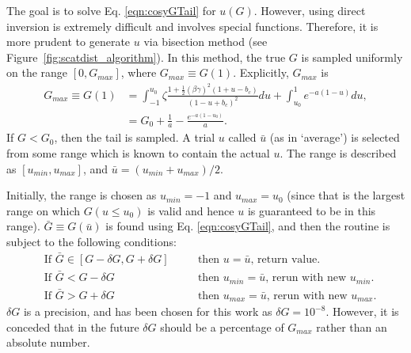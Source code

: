 The goal is to solve Eq. \eqref{eqn:cosyGTail} for $u(G)$. However, using direct inversion is extremely difficult and involves special functions. Therefore, it is more prudent to generate  $u$ via bisection method (see Figure~\ref{fig:scatdist_algorithm}). In this method, the true $G$ is sampled uniformly on the range $[0,G_{max}]$, where $G_{max} \equiv G(1)$. Explicitly, $G_{max}$ is
\begin{align*}
G_{max}\equiv G(1) &=\int_{-1} ^{u_0} \zeta\frac{1+\frac{1}{2}(\beta\gamma)^2(1+u-b_c)}{(1-u+b_c)^2}du+\int_{u_0} ^1 e^{-a(1-u)} du,\\
&= G_0+\frac{1}{a}-\frac{e^{-a(1-u_0)}}{a}.
\end{align*}
If $G < G_0$, then the tail is sampled. A trial $u$ called $\bar{u}$ (as in `average') is selected from some range which is known to contain the actual $u$. The range is described as $[u_{min},u_{max}]$, and $\bar{u}=(u_{min}+u_{max})/2$. 

Initially, the range is chosen as $u_{min}=-1$ and $u_{max}=u_0$ (since that is the largest range on which $G(u \leq u_0)$ is valid and hence $u$ is guaranteed to be in this range). $\bar{G} \equiv G(\bar{u})$ is found using Eq. \eqref{eqn:cosyGTail}, and then the routine is subject to the following conditions:
\begin{align*}
&\text{If } \bar{G}\in [G-\delta G,G+\delta G] &\quad &\text{then } u=\bar{u}\text{, return value.}\\
&\text{If } \bar{G} < G-\delta G &\quad &\text{then } u_{min}=\bar{u} \text{, rerun with new }u_{min}.\\
&\text{If } \bar{G} > G+\delta G &\quad &\text{then } u_{max}=\bar{u} \text{, rerun with new }u_{max}.
\end{align*}
$\delta G$ is a precision, and has been chosen for this work as $\delta G = 10^{-8}$. However, it is conceded that in the future $\delta G$ should be a percentage of $G_{max}$ rather than an absolute number.

